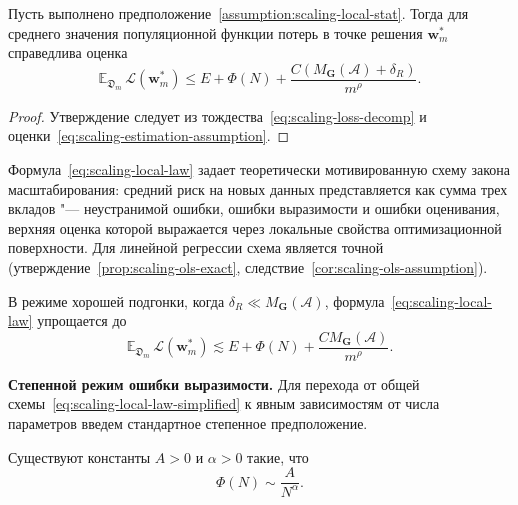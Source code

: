 \begin{proposition}
    \label{prop:scaling-local-law}
    Пусть выполнено предположение~\ref{assumption:scaling-local-stat}. Тогда для среднего значения популяционной функции потерь в точке решения $\mathbf w_m^*$ справедлива оценка
    \begin{equation}
        \label{eq:scaling-local-law}
        \mathbb E_{\mathfrak D_m}\,\mathcal L(\mathbf w_m^*)
        \le
        E
        +
        \Phi(N)
        +
        \frac{C\left(M_{\mathbf G}(\mathcal A)+\delta_R\right)}{m^{\rho}}.
    \end{equation}
\end{proposition}

\begin{proof}
    Утверждение следует из тождества~\eqref{eq:scaling-loss-decomp} и оценки~\eqref{eq:scaling-estimation-assumption}.
\end{proof}

Формула~\eqref{eq:scaling-local-law} задает теоретически мотивированную схему закона масштабирования: средний риск на новых данных представляется как сумма трех вкладов "--- неустранимой ошибки, ошибки выразимости и ошибки оценивания, верхняя оценка которой выражается через локальные свойства оптимизационной поверхности. Для линейной регрессии схема является точной (утверждение~\ref{prop:scaling-ols-exact}, следствие~\ref{cor:scaling-ols-assumption}).

В режиме хорошей подгонки, когда $\delta_R \ll M_{\mathbf G}(\mathcal A)$, формула~\eqref{eq:scaling-local-law} упрощается до
\begin{equation}
    \label{eq:scaling-local-law-simplified}
    \mathbb E_{\mathfrak D_m}\,\mathcal L(\mathbf w_m^*)
    \lesssim
    E
    +
    \Phi(N)
    +
    \frac{C M_{\mathbf G}(\mathcal A)}{m^{\rho}}.
\end{equation}

\textbf{Степенной режим ошибки выразимости.} Для перехода от общей схемы~\eqref{eq:scaling-local-law-simplified} к явным зависимостям от числа параметров введем стандартное степенное предположение.

\begin{assumption}
    \label{assumption:scaling-Phi}
    Существуют константы $A>0$ и $\alpha>0$ такие, что
    \begin{equation}
        \label{eq:scaling-Phi-power}
        \Phi(N)
        \sim
        \frac{A}{N^{\alpha}}.
    \end{equation}
\end{assumption}

